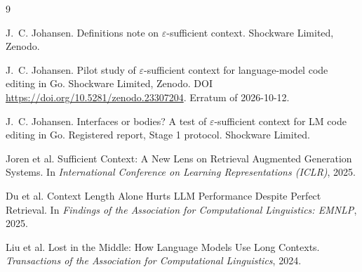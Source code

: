 \documentclass[10pt]{article}
\newcommand{\eps}{\varepsilon}
\begin{document}
\begin{thebibliography}{9}

J.~C. Johansen.
Definitions note on $\eps$-sufficient context.
Shockware Limited, Zenodo.

J.~C. Johansen.
Pilot study of $\eps$-sufficient context for language-model code editing in Go.
Shockware Limited, Zenodo.
DOI \url{https://doi.org/10.5281/zenodo.23307204}.
Erratum of 2026-10-12.

J.~C. Johansen.
Interfaces or bodies? A test of $\eps$-sufficient context for LM code editing in Go.
Registered report, Stage 1 protocol. Shockware Limited.

Joren et al.
Sufficient Context: A New Lens on Retrieval Augmented Generation Systems.
In \emph{International Conference on Learning Representations (ICLR)}, 2025.

Du et al.
Context Length Alone Hurts LLM Performance Despite Perfect Retrieval.
In \emph{Findings of the Association for Computational Linguistics: EMNLP}, 2025.

Liu et al.
Lost in the Middle: How Language Models Use Long Contexts.
\emph{Transactions of the Association for Computational Linguistics}, 2024.

\end{thebibliography}
\end{document}
